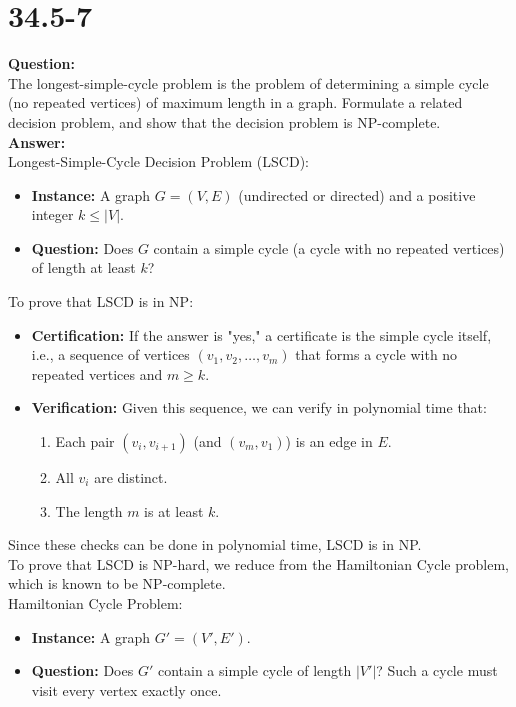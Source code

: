 \documentclass[12pt]{article}
\begin{document}
\section{34.5-7}
\textbf{Question:}\\
The longest-simple-cycle problem is the problem of determining a simple cycle (no repeated vertices) of maximum length in a graph. Formulate a related decision problem, and show that the decision problem is NP-complete.\\
\textbf{Answer:}\\
Longest-Simple-Cycle Decision Problem (LSCD):
\begin{itemize}
    \item \textbf{Instance:} A graph \( G = (V,E) \) (undirected or directed) and a positive integer \( k \leq |V| \).
    \item \textbf{Question:} Does \( G \) contain a simple cycle (a cycle with no repeated vertices) of length at least \( k \)?
\end{itemize}
To prove that LSCD is in NP:
\begin{itemize}
    \item \textbf{Certification:} If the answer is "yes," a certificate is the simple cycle itself, i.e., a sequence of vertices \( (v_1, v_2, \ldots, v_m) \) that forms a cycle with no repeated vertices and \( m \geq k \).
    \item \textbf{Verification:} Given this sequence, we can verify in polynomial time that:
    \begin{enumerate}
        \item Each pair \( (v_i, v_{i+1}) \) (and \( (v_m, v_1) \)) is an edge in \( E \).
        \item All \( v_i \) are distinct.
        \item The length \( m \) is at least \( k \).
    \end{enumerate}
\end{itemize}
Since these checks can be done in polynomial time, LSCD is in NP.\\
To prove that LSCD is NP-hard, we reduce from the Hamiltonian Cycle problem, which is known to be NP-complete.\\
Hamiltonian Cycle Problem:
\begin{itemize}
    \item \textbf{Instance:} A graph \( G' = (V', E') \).
    \item \textbf{Question:} Does \( G' \) contain a simple cycle of length \( |V'| \)? Such a cycle must visit every vertex exactly once.
\end{itemize}
\end{document}
